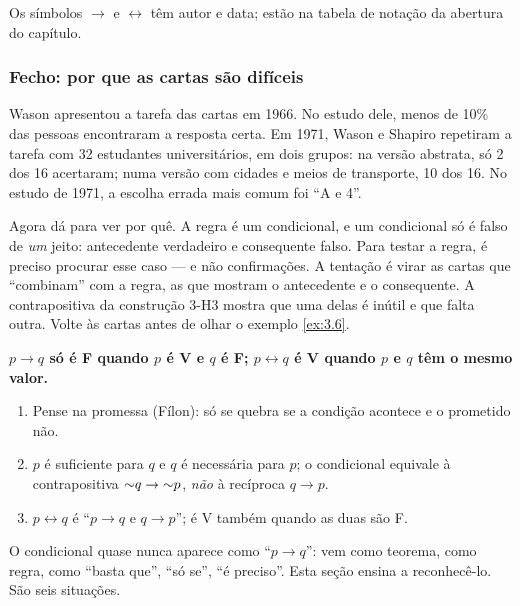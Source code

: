 Os símbolos $\rightarrow$ e $\leftrightarrow$ têm autor e data; estão na tabela de notação da abertura do capítulo.

\subsubsection{Fecho: por que as cartas são difíceis}
Wason apresentou a tarefa das cartas em 1966. No estudo dele, menos de 10\% das pessoas encontraram a resposta certa. Em 1971, Wason e Shapiro repetiram a tarefa com 32 estudantes universitários, em dois grupos: na versão abstrata, só 2 dos 16 acertaram; numa versão com cidades e meios de transporte, 10 dos 16. No estudo de 1971, a escolha errada mais comum foi \enquote{A e 4}.

Agora dá para ver por quê. A regra é um condicional, e um condicional só é falso de \emph{um} jeito: antecedente verdadeiro e consequente falso. Para testar a regra, é preciso procurar esse caso — e não confirmações. A tentação é virar as cartas que \enquote{combinam} com a regra, as que mostram o antecedente e o consequente. A contrapositiva da construção 3-H3 mostra que uma delas é inútil e que falta outra. Volte às cartas antes de olhar o exemplo \ref{ex:3.6}.

\begin{paralembrar}\label{lembrar-u3}
\textbf{$p\rightarrow q$ só é F quando $p$ é V e $q$ é F; $p\leftrightarrow q$ é V quando $p$ e $q$ têm o mesmo valor.}
\begin{enumerate}[label=\arabic*.,leftmargin=1.4em]
  \item Pense na promessa (Fílon): só se quebra se a condição acontece e o prometido não.
  \item $p$ é suficiente para $q$ e $q$ é necessária para $p$; o condicional equivale à contrapositiva ${{\sim}}q\rightarrow{{\sim}}p$, \emph{não} à recíproca $q\rightarrow p$.
  \item $p\leftrightarrow q$ é \enquote{$p\rightarrow q$ e $q\rightarrow p$}; é V também quando as duas são F.
\end{enumerate}
\end{paralembrar}

\OndeEUsado

O condicional quase nunca aparece como \enquote{$p\rightarrow q$}: vem como teorema, como regra, como \enquote{basta que}, \enquote{só se}, \enquote{é preciso}. Esta seção ensina a reconhecê-lo. São seis situações.

